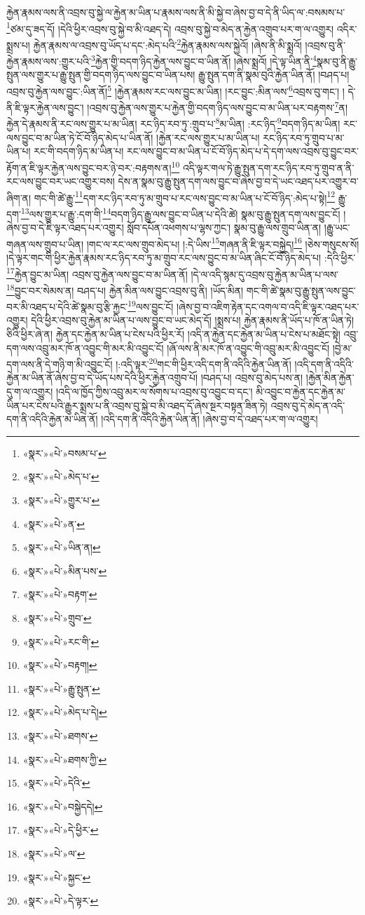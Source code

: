 རྐྱེན་རྣམས་ལས་ནི་འབྲས་བུ་སྐྱེ་ལ་རྐྱེན་མ་ཡིན་པ་རྣམས་ལས་ནི་མི་སྐྱེ་བ་ཞེས་བྱ་བ་དེ་ནི་ཡིད་ལ་:བསམས་པ་\footnote{«སྣར་»«པེ་»བསམ་པ་}ཙམ་དུ་ཟད་དོ། །དེའི་ཕྱིར་འབྲས་བུ་སྐྱེ་བ་མི་འཐད་དེ། འབྲས་བུ་སྐྱེ་བ་མེད་ན་རྐྱེན་འགྲུབ་པར་ག་ལ་འགྱུར། འདིར་སྨྲས་པ། རྐྱེན་རྣམས་ལ་འབྲས་བུ་ཡོད་པ་དང་:མེད་པའི་\footnote{«སྣར་»«པེ་»མེད་པ་}རྐྱེན་རྣམས་ལས་སྐྱེའོ། །ཞེས་ནི་མི་སྨྲའོ། །འབྲས་བུ་ནི་རྐྱེན་རྣམས་ལས་:གྱུར་པའི་\footnote{«སྣར་»«པེ་»གྱུར་པ་}རྐྱེན་གྱི་བདག་ཉིད་རྐྱེན་ལས་བྱུང་བ་ཡིན་ནོ། །ཞེས་སྨྲའོ། །དེ་ལྟ་ཡིན་ནི་\footnote{«སྣར་»«པེ་»ན་}སྣམ་བུ་ནི་རྒྱུ་སྤུན་ལས་གྱུར་པ་རྒྱུ་སྤུན་གྱི་བདག་ཉིད་ལས་བྱུང་བ་ཡིན་པས། རྒྱུ་སྤུན་དག་ནི་སྣམ་བུའི་རྐྱེན་ཡིན་ནོ། །བཤད་པ། འབྲས་བུ་རྐྱེན་ལས་བྱུང་:ཡིན་ནོ།\footnote{«སྣར་»«པེ་»ཡིན་ན།} །རྐྱེན་རྣམས་རང་ལས་བྱུང་མ་ཡིན། །རང་བྱུང་:མིན་ལས་\footnote{«སྣར་»«པེ་»མིན་པས་}འབྲས་བུ་གང་། །
དེ་ནི་ཇི་ལྟར་རྐྱེན་ལས་བྱུང་། །འབྲས་བུ་རྐྱེན་ལས་གྱུར་པ་རྐྱེན་གྱི་བདག་ཉིད་ལས་བྱུང་བ་མ་ཡིན་པར་བརྟགས་\footnote{«སྣར་»«པེ་»བརྟག་}ན། རྐྱེན་དེ་རྣམས་ནི་རང་ལས་གྱུར་པ་མ་ཡིན། རང་ཉིད་རབ་ཏུ་:གྲུབ་པ་\footnote{«སྣར་»«པེ་»གྲུབ་}མ་ཡིན། :རང་ཉིད་\footnote{«སྣར་»«པེ་»རང་གི་}བདག་ཉིད་མ་ཡིན། རང་ལས་བྱུང་བ་མ་ཡིན་ཏེ་ངོ་བོ་ཉིད་མེད་པ་ཡིན་ནོ། །རྐྱེན་རང་ལས་གྱུར་པ་མ་ཡིན་པ། རང་ཉིད་རབ་ཏུ་གྲུབ་པ་མ་ཡིན་པ། རང་གི་བདག་ཉིད་མ་ཡིན་པ། རང་ལས་བྱུང་བ་མ་ཡིན་པ་ངོ་བོ་ཉིད་མེད་པ་དེ་དག་ལས་འབྲས་བུ་བྱུང་བར་རྟོག་ན་ཇི་ལྟར་རྐྱེན་ལས་བྱུང་བར་ཉེ་བར་:བརྟགས་ན།\footnote{«སྣར་»«པེ་»བརྟག།} འདི་ལྟར་གལ་ཏེ་རྒྱུ་སྤུན་དག་རང་ཉིད་རབ་ཏུ་གྲུབ་ན་ནི་རང་ལས་བྱུང་བར་ཡང་འགྱུར་བས། དེས་ན་སྣམ་བུ་རྒྱུ་སྤུན་དག་ལས་བྱུང་བ་ཞེས་བྱ་བ་དེ་ཡང་འཐད་པར་འགྱུར་བ་ཞིག་ན། གང་གི་ཚེ་རྒྱུ་\footnote{«སྣར་»«པེ་»རྒྱུ་སྤུན་}དག་རང་ཉིད་རབ་ཏུ་མ་གྲུབ་པ་རང་ལས་བྱུང་བ་མ་ཡིན་པ་ངོ་བོ་ཉིད་:མེད་པ་སྟེ།\footnote{«སྣར་»«པེ་»མེད་པ་དེ།} རྒྱུ་དག་\footnote{«སྣར་»«པེ་»ཐགས་}ལས་གྱུར་པ་རྒྱུ་:དག་གི་\footnote{«སྣར་»«པེ་»ཐགས་ཀྱི་}བདག་ཉིད་རྒྱུ་ལས་བྱུང་བ་ཡིན་པ་དེའི་ཚེ། སྣམ་བུ་རྒྱུ་སྤུན་དག་ལས་བྱུང་ངོ། །ཞེས་བྱ་བ་དེ་ཇི་ལྟར་འཐད་པར་འགྱུར། སློབ་དཔོན་འཕགས་པ་ལྷས་ཀྱང་། སྣམ་བུ་རྒྱུ་ལས་གྲུབ་ཡིན་ན། །རྒྱུ་ཡང་གཞན་ལས་གྲུབ་པ་ཡིན། །གང་ལ་རང་ལས་གྲུབ་མེད་པ། །:དེ་ཡིས་\footnote{«སྣར་»«པེ་»དེའི་}གཞན་ནི་ཇི་ལྟར་བསྐྱེད།\footnote{«སྣར་»«པེ་»བསྐྱེདདེ།} །ཅེས་གསུངས་སོ། །དེ་ལྟར་གང་གི་ཕྱིར་རྐྱེན་རྣམས་རང་ཉིད་རབ་ཏུ་མ་གྲུབ་རང་ལས་བྱུང་བ་མ་ཡིན་ཞིང་ངོ་བོ་ཉིད་མེད་པ། :དེའི་ཕྱིར་\footnote{«སྣར་»«པེ་»དེ་ཕྱིར་}རྐྱེན་བྱུང་མ་ཡིན། འབྲས་བུ་རྐྱེན་ལས་བྱུང་བ་མ་ཡིན་ནོ། །དེ་ལ་འདི་སྙམ་དུ་འབྲས་བུ་རྐྱེན་མ་ཡིན་པ་ལས་\footnote{«སྣར་»«པེ་»ལ་}བྱུང་བར་སེམས་ན། བཤད་པ། རྐྱེན་མིན་ལས་བྱུང་འབྲས་བུ་ནི། །ཡོད་མིན། གང་གི་ཚེ་སྣམ་བུ་རྒྱུ་སྤུན་ལས་བྱུང་བར་མི་འཐད་པ་དེའི་ཚེ་སྣམ་བུ་རྩི་རྐྱང་\footnote{«སྣར་»«པེ་»སྐྱང་}ལས་བྱུང་ངོ། །ཞེས་བྱ་བ་འཇིག་རྟེན་དང་འགལ་བ་འདི་ཇི་ལྟར་འཐད་པར་འགྱུར། དེའི་ཕྱིར་འབྲས་བུ་རྐྱེན་མ་ཡིན་པ་ལས་བྱུང་བ་ཡང་མེད་དོ། །སྨྲས་པ། རྐྱེན་རྣམས་ནི་ཡོད་པ་ཁོ་ན་ཡིན་ཏེ། ཅིའི་ཕྱིར་ཞེ་ན། རྐྱེན་དང་རྐྱེན་མ་ཡིན་པ་ངེས་པའི་ཕྱིར་རོ། །འདི་ན་རྐྱེན་དང་རྐྱེན་མ་ཡིན་པ་ངེས་པ་མཐོང་སྟེ། འབྲུ་དག་ལས་འབྲུ་མར་ཁོ་ན་འབྱུང་གི་མར་མི་འབྱུང་ངོ། །ཞོ་ལས་ནི་མར་ཁོ་ན་འབྱུང་གི་འབྲུ་མར་མི་འབྱུང་ངོ། །བྱེ་མ་དག་ལས་ནི་དེ་གཉི་ག་མི་འབྱུང་ངོ། །:འདི་ལྟར་\footnote{«སྣར་»«པེ་»དེ་ལྟར་}གང་གི་ཕྱིར་འདི་དག་ནི་འདིའི་རྐྱེན་ཡིན་ནོ། །འདི་དག་ནི་འདིའི་རྐྱེན་མ་ཡིན་ནོ་ཞེས་བྱ་བ་དེ་ཡོད་པས་དེའི་ཕྱིར་རྐྱེན་འགྲུབ་པོ། །བཤད་པ། འབྲས་བུ་མེད་པས་ན། །རྐྱེན་མིན་རྐྱེན་དུ་ག་ལ་འགྱུར། །འདི་ལ་ཁྱོད་ཀྱིས་འབྲུ་མར་ལ་སོགས་པ་འབྲས་བུ་འབྱུང་བ་དང་། མི་འབྱུང་བ་རྐྱེན་དང་རྐྱེན་མ་ཡིན་པར་ངེས་པའི་རྒྱུར་སྨྲས་པ་ནི་འབྲས་བུ་སྐྱེ་བ་མི་འཐད་དོ་ཞེས་སྔར་བསྟན་ཟིན་ཏེ། འབྲས་བུ་དེ་མེད་ན་འདི་དག་ནི་འདིའི་རྐྱེན་མ་ཡིན་ནོ། །འདི་དག་ནི་འདིའི་རྐྱེན་ཡིན་ནོ། །ཞེས་བྱ་བ་དེ་འཐད་པར་ག་ལ་འགྱུར། 